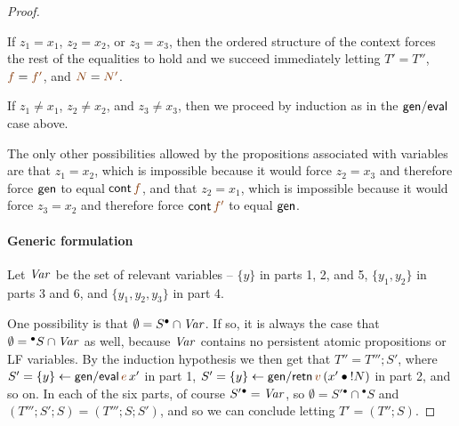 \begin{proof}
\begin{description}
    If $z_1 = x_1$, $z_2 = x_2$, or $z_3 = x_3$, then the ordered
    structure of the context forces the rest of the equalities to hold
    and we succeed immediately letting $T' = T''$, $\lf{f} = \lf{f'}$, and
    $\lf{N} = \lf{N'}$. 

    \medskip If $z_1 \neq x_1$, $z_2 \neq x_2$, and $z_3 \neq x_3$,
    then we proceed by induction as in the ${\sf gen/eval}$ case
    above.
  
    \medskip The only other possibilities allowed by the propositions
    associated with variables are that $z_1 = x_2$, which is impossible
    because it would force $z_2 = x_3$ and therefore force
    $\sf{gen}$ to equal ${\sf cont}\,\lf{f}$, and that $z_2 = x_1$, which
    is impossible because it would force $z_3 = x_2$ and therefore force
    ${\sf cont}\,\lf{f'}$ to equal ${\sf gen}$. 

  \end{description}


  \paragraph{Generic formulation}

  Let ${\it Var}$ be the set of relevant variables -- $\{y\}$ in parts
  1, 2, and 5, $\{y_1, y_2\}$ in parts 3 and 6, and $\{y_1,y_2,y_3\}$
  in part 4.

  One possibility is that $\emptyset = S^{\bullet} \cap {\it Var}$. If so, it
  is always the case that $\emptyset = {^{\bullet}S} \cap {\it Var}$ as well,
  because ${\it Var}$ contains no persistent atomic propositions or LF
  variables. By the induction hypothesis we then get that $T'' = T''';
  S'$, where $S' = \trstep{y}{{\sf gen/eval}\,\lf{e}\,x'}$ in part 1,
  $S' = \trstep{y}{{\sf gen/retn}\,\lf{v}\,(\tfuser{x'}{\tbangr{N}})}$
  in part 2, and so on.  In each of the six parts, of course
  $S'{^\bullet} = {\it Var}$, so $\emptyset = S'{^\bullet} \cap {^\bullet}S$
  and $\left(T'''; S'; S\right) = \left(T'''; S; S'\right)$, and so we can
  conclude letting $T' = \left(T''; S\right)$.


\end{proof}
